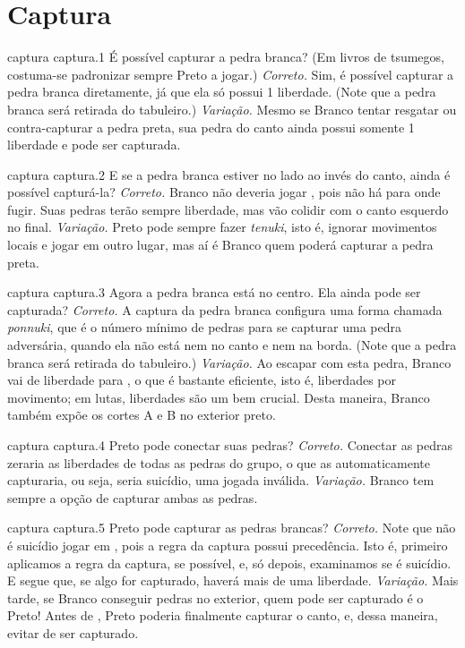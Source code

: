 \chapter{Captura}

\emptypage

\problemAnswerDiagram
  {captura}
  {captura.1}
  {É possível capturar a pedra branca? (Em livros de tsumegos, costuma-se padronizar sempre Preto a jogar.)}
  {\emph{Correto.} Sim, é possível capturar a pedra branca diretamente, já que ela só possui 1 liberdade. (Note que a pedra branca será retirada do tabuleiro.)}
  {\emph{Variação.} Mesmo se Branco tentar resgatar ou contra-capturar a pedra preta, sua pedra do canto ainda possui somente 1 liberdade e pode ser capturada.}

\problemAnswerDiagram
  {captura}
  {captura.2}
  {E se a pedra branca estiver no lado ao invés do canto, ainda é possível capturá-la?}
  {\emph{Correto.} Branco não deveria jogar , pois não há para onde fugir. Suas pedras terão sempre  liberdade, mas vão colidir com o canto esquerdo no final.}
  {\emph{Variação.} Preto pode sempre fazer \emph{tenuki}, isto é, ignorar movimentos locais e jogar em outro lugar, mas aí é Branco quem poderá capturar a pedra preta.}

\problemAnswerDiagram
  {captura}
  {captura.3}
  {Agora a pedra branca está no centro. Ela ainda pode ser capturada?}
  {\emph{Correto.} A captura da pedra branca configura uma forma chamada \emph{ponnuki}, que é o número mínimo de pedras para se capturar uma pedra adversária, quando ela não está nem no canto e nem na borda. (Note que a pedra branca será retirada do tabuleiro.)}
  {\emph{Variação.} Ao escapar com esta pedra, Branco vai de  liberdade para , o que é bastante eficiente, isto é,  liberdades por movimento; em lutas, liberdades são um bem crucial. Desta maneira, Branco também expõe os cortes A e B no exterior preto.}


\problemAnswerDiagram
  {captura}
  {captura.4}
  {Preto pode conectar suas pedras?}
  {\emph{Correto.} Conectar as pedras zeraria as liberdades de todas as pedras do grupo, o que as automaticamente capturaria, ou seja, seria suicídio, uma jogada inválida.}
  {\emph{Variação.} Branco tem sempre a opção de capturar ambas as pedras.}

\problemAnswerDiagram
  {captura}
  {captura.5}
  {Preto pode capturar as pedras brancas?}
  {\emph{Correto.} Note que não é suicídio jogar em , pois a regra da captura possui precedência. Isto é, primeiro aplicamos a regra da captura, se possível, e, só depois, examinamos se é suicídio. E segue que, se algo for capturado, haverá mais de uma liberdade.}
  {\emph{Variação.} Mais tarde, se Branco conseguir pedras no exterior, quem pode ser capturado é o Preto! Antes de , Preto poderia finalmente capturar o canto, e, dessa maneira, evitar de ser capturado.}

